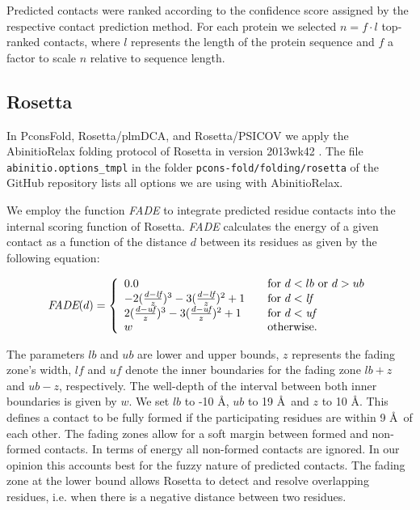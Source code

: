 \documentclass{bioinfo}
\begin{document}
\begin{methods}
Predicted contacts were ranked according to the confidence score
assigned by the respective contact prediction method. For each protein
we selected $n = f \cdot l$ top-ranked contacts, where $l$ represents
the length of the protein sequence and $f$ a factor to scale $n$
relative to sequence length. 


\subsection{Rosetta}
In PconsFold, Rosetta/plmDCA, and Rosetta/PSICOV we apply the
AbinitioRelax folding protocol \cite[]{rohl_protein_2004} of Rosetta
in version 2013wk42 \cite[]{leaver-fay_rosetta3:_2011}. The file {\tt
  abinitio.options\_tmpl} in the folder {\tt pcons-fold/folding/rosetta} of the GitHub
repository lists all options we are using with AbinitioRelax. 

We employ the function \emph{FADE} to integrate predicted residue
contacts into the internal scoring function of Rosetta. \emph{FADE}
calculates the energy of a given contact as a function of the distance
$d$ between its residues as given by the following equation:

\begin{equation}%
\textit{FADE}(d) = \left\{
\begin{array}{l l l}\label{eq:fade}
0.0 & \quad \textrm{for $d < lb$ or $d > ub$} \\
-2(\frac{d - \textit{lf}}{z})^3 - 3(\frac{d - \textit{lf}}{z})^2 + 1 & \quad \textrm{for $d < \textit{lf}$} \\
2(\frac{d - \textit{uf}}{z})^3 - 3(\frac{d - \textit{uf}}{z})^2 + 1 & \quad \textrm{for $d < \textit{uf}$} \\
w & \quad \textrm{otherwise.} \\
\end{array} \right.
\end{equation}

The parameters $lb$ and $ub$ are lower and upper bounds, $z$
represents the fading zone's width, $\textit{lf}$ and $\textit{uf}$
denote the inner boundaries for the fading zone $lb + z$ and $ub - z$,
respectively. The well-depth of the interval between both inner
boundaries is given by $w$. We set $lb$ to -10 \AA, $ub$ to 19 \AA\
and $z$ to 10 \AA. This defines a contact to be fully formed if the
participating residues are within 9 \AA\ of each other. The fading
zones allow for a soft margin between formed and non-formed
contacts. In terms of energy all non-formed contacts are ignored. In
our opinion this accounts best for the fuzzy nature of predicted
contacts. The fading zone at the lower bound allows Rosetta to detect
and resolve overlapping residues, i.e. when there is a negative
distance between two residues. 


\end{methods}
\end{document}

